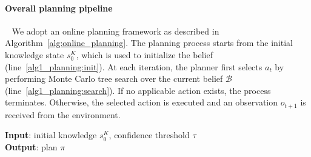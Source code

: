 \paragraph{Overall planning pipeline}~\label{method:planning}
We adopt an online planning framework as described in Algorithm~\ref{alg:online_planning}. The planning process starts from the initial knowledge state $s^{K}_{0}$, which is used to initialize the belief (line~\ref{alg1_planning:init}). At each iteration, the planner first selects $a_t$ by performing Monte Carlo tree search over the current belief $\mathcal{B}$ (line~\ref{alg1_planning:search}). If no applicable action exists, the process terminates. Otherwise, the selected action is executed and an observation $o_{t+1}$ is received from the environment.

\begin{algorithm}[t]
\caption{Planning Pipeline}
\label{alg:online_planning}
\textbf{Input}: initial knowledge $s^{K}_{0}$, confidence threshold $\tau$ \\
\textbf{Output}: plan $\pi$
\BlankLine

\end{algorithm}

